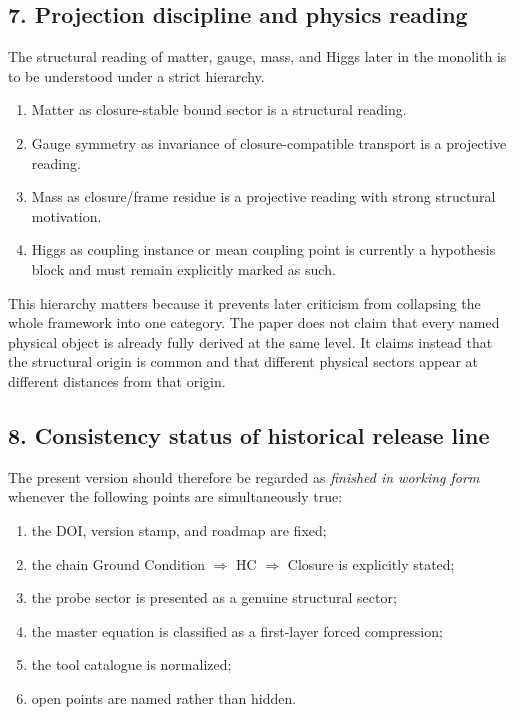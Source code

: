 \documentclass[12pt,a4paper]{article}
\DeclareRobustCommand{\QSCver}[1]{archival stage}
\renewcommand{\QSCver}[1]{historical release line}
\begin{document}
\subsection*{7. Projection discipline and physics reading}
The structural reading of matter, gauge, mass, and Higgs later in the monolith
is to be understood under a strict hierarchy.
\begin{enumerate}[leftmargin=2em]
 \item Matter as closure-stable bound sector is a structural reading.
 \item Gauge symmetry as invariance of closure-compatible transport is a
 projective reading.
 \item Mass as closure/frame residue is a projective reading with strong
 structural motivation.
 \item Higgs as coupling instance or mean coupling point is currently a
 hypothesis block and must remain explicitly marked as such.
\end{enumerate}

This hierarchy matters because it prevents later criticism from collapsing the
whole framework into one category. The paper does not claim that every named
physical object is already fully derived at the same level. It claims instead
that the structural origin is common and that different physical sectors appear
at different distances from that origin.

\subsection*{8. Consistency status of \QSCver{v1.2.0}}
The present version should therefore be regarded as \emph{finished in working
form} whenever the following points are simultaneously true:
\begin{enumerate}[leftmargin=2em]
 \item the DOI, version stamp, and roadmap are fixed;
 \item the chain Ground Condition $\Rightarrow$ HC $\Rightarrow$ Closure is
 explicitly stated;
 \item the probe sector is presented as a genuine structural sector;
 \item the master equation is classified as a first-layer forced compression;
 \item the tool catalogue is normalized;
 \item open points are named rather than hidden.
\end{enumerate}
\end{document}
